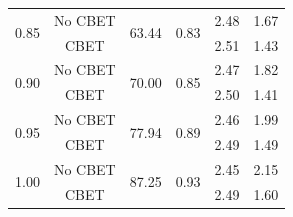 \begin{table}[]
\begin{tabular}{cccccc}
    \multirow{2}{*}{0.85} & No CBET & \multirow{2}{*}{63.44}                                                             & \multirow{2}{*}{0.83}                                                   & 2.48                                                                      & 1.67                                 \\
                          & CBET    &                                                                                    &                                                                         & 2.51                                                                      & 1.43                                 \\ \hline
    \multirow{2}{*}{0.90} & No CBET & \multirow{2}{*}{70.00}                                                             & \multirow{2}{*}{0.85}                                                   & 2.47                                                                      & 1.82                                 \\
                          & CBET    &                                                                                    &                                                                         & 2.50                                                                      & 1.41                                 \\ \hline
    \multirow{2}{*}{0.95} & No CBET & \multirow{2}{*}{77.94}                                                             & \multirow{2}{*}{0.89}                                                   & 2.46                                                                      & 1.99                                 \\
                          & CBET    &                                                                                    &                                                                         & 2.49                                                                      & 1.49                                 \\ \hline
    \multirow{2}{*}{1.00} & No CBET & \multirow{2}{*}{87.25}                                                             & \multirow{2}{*}{0.93}                                                   & 2.45                                                                      & 2.15                                 \\
                          & CBET    &                                                                                    &                                                                         & 2.49                                                                      & 1.60                                 \\ \hline

\end{tabular}
\end{table}
